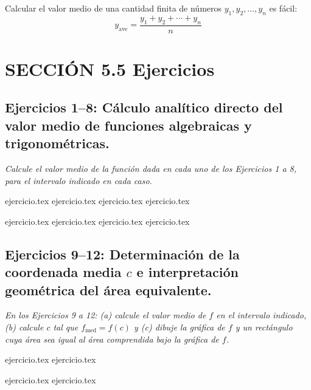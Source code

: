 
Calcular el valor medio de una cantidad finita de números $y_1, y_2, \dots, y_n$ es fácil:
$$y_{\text{ave}} = \frac{y_1 + y_2 + \cdots + y_n}{n}$$

\section*{SECCIÓN 5.5 \quad Ejercicios}

\subsection*{Ejercicios 1--8: Cálculo analítico directo del valor medio de funciones algebraicas y trigonométricas.}

\noindent \textit{Calcule el valor medio de la función dada en cada uno de los Ejercicios 1 a 8, para el intervalo indicado en cada caso.}

\begin{enumerate}
    \begin{minipage}{0.45\textwidth}
    {ejercicio.tex}
    {ejercicio.tex}
    {ejercicio.tex}
    {ejercicio.tex}
    \end{minipage}%
    \begin{minipage}{0.45\textwidth}
    {ejercicio.tex}
    {ejercicio.tex}
    {ejercicio.tex}
    {ejercicio.tex}
    \end{minipage}
\end{enumerate}

\subsection*{Ejercicios 9--12: Determinación de la coordenada media $c$ e interpretación geométrica del área equivalente.}

\noindent \textit{En los Ejercicios 9 a 12: (a) calcule el valor medio de $f$ en el intervalo indicado, (b) calcule $c$ tal que $f_{\text{med}} = f(c)$ y (c) dibuje la gráfica de $f$ y un rectángulo cuya área sea igual al área comprendida bajo la gráfica de $f$.}

\begin{enumerate}
    \setcounter{enumi}{8}
    \begin{minipage}{0.45\textwidth}
    {ejercicio.tex}
    {ejercicio.tex}
    \end{minipage}%
    \begin{minipage}{0.45\textwidth}
    {ejercicio.tex}
    {ejercicio.tex}
    \end{minipage}
\end{enumerate}

